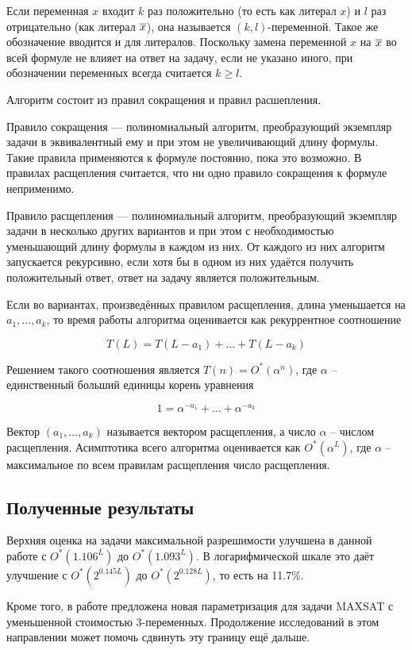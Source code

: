 Если переменная $x$ входит $k$ раз положительно (то есть как литерал $x$) и $l$ раз отрицательно (как литерал $\overline{x}$), она называется $(k,l)$-переменной. Такое же обозначение вводится и для литералов. Поскольку замена переменной $x$ на $\overline{x}$ во всей формуле не влияет на ответ на задачу, если не указано иного, при обозначении переменных всегда считается $k \geq l$.

Алгоритм состоит из правил сокращения и правил расшепления.

Правило сокращения — полиномиальный алгоритм, преобразующий экземпляр задачи в эквивалентный ему и при этом не увеличивающий длину формулы. Такие правила применяются к формуле постоянно, пока это возможно. В правилах расщепления считается, что ни одно правило сокращения к формуле неприменимо.

Правило расщепления — полиномиальный алгоритм, преобразующий экземпляр задачи в несколько других вариантов и при этом с необходимостью уменьшающий длину формулы в каждом из них. От каждого из них алгоритм запускается рекурсивно, если хотя бы в одном из них удаётся получить положительный ответ, ответ на задачу является положительным.

Если во вариантах, произведённых правилом расщепления, длина уменьшается на $a_1, \dots, a_k$, то время работы алгоритма оценивается как рекуррентное соотношение

$$
 T(L) = T(L - a_1) + \dots + T(L - a_k)
$$

Решением такого соотношения является $T(n) = O^*(\alpha^n)$, где $\alpha$ -- единственный больший единицы корень уравнения

$$
 1 = \alpha^{-a_1} + \dots + \alpha^{-a_k}
$$

Вектор $(a_1, \dots, a_k)$ называется вектором расщепления, а число $\alpha$ -- числом расщепления. Асимптотика всего алгоритма оценивается как $O^*(\alpha^L)$, где $\alpha$ -- максимальное по всем правилам расщепления число расщепления.

\subsection*{Полученные результаты}

\firstpar{}Верхняя оценка на задачи максимальной разрешимости улучшена в данной работе с $O^*(1.106^L)$ до $O^*(1.093^L)$. В логарифмической шкале это даёт улучшение с $O^*(2^{0.145L})$ до $O^*(2^{0.128L})$, то есть на 11.7\%.

Кроме того, в работе предложена новая параметризация для задачи MAXSAT с уменьшенной стоимостью 3-переменных. Продолжение исследований в этом направлении может помочь сдвинуть эту границу ещё дальше.
